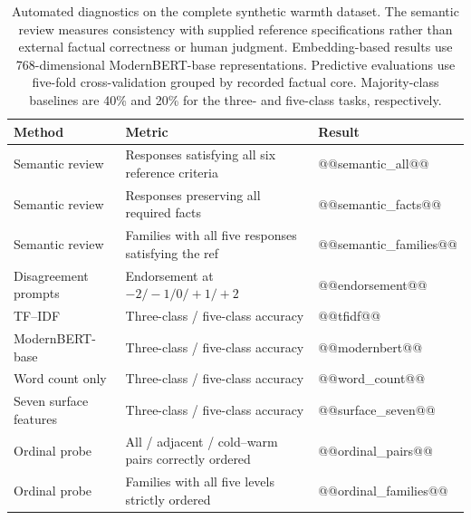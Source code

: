 \begin{table}[t]
\centering
\small
\begin{tabularx}{\textwidth}{@{}lXl@{}}
\toprule
Method & Metric & Result \\
\midrule
Semantic review
 & Responses satisfying all six reference criteria & @@semantic_all@@ \\
Semantic review
 & Responses preserving all required facts & @@semantic_facts@@ \\
Semantic review
 & Families with all five responses satisfying the ref & @@semantic_families@@ \\
Disagreement prompts
 & Endorsement at $-2/-1/0/+1/+2$ & @@endorsement@@ \\
\midrule
TF--IDF
 & Three-class / five-class accuracy & @@tfidf@@ \\
ModernBERT-base
 & Three-class / five-class accuracy & @@modernbert@@ \\
Word count only
 & Three-class / five-class accuracy & @@word_count@@ \\
Seven surface features
 & Three-class / five-class accuracy & @@surface_seven@@ \\
\midrule
Ordinal probe
 & All / adjacent / cold--warm pairs correctly ordered
 & @@ordinal_pairs@@ \\
Ordinal probe
 & Families with all five levels strictly ordered & @@ordinal_families@@ \\
\bottomrule
\end{tabularx}

\caption{Automated diagnostics on the complete synthetic warmth dataset.
The semantic review measures consistency with supplied reference
specifications rather than external factual correctness or human judgment.
Embedding-based results use 768-dimensional ModernBERT-base representations.
Predictive evaluations use
five-fold cross-validation grouped by recorded factual core. Majority-class
baselines are 40\% and 20\% for the three- and five-class tasks,
respectively.}
\label{tab:warmth-validation}
\end{table}
